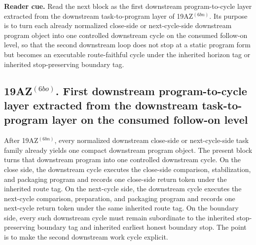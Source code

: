 \noindent\textbf{Reader cue.} Read the next block as the first downstream program-to-cycle layer extracted from the downstream task-to-program layer of 19AZ$^{(6bn)}$. Its purpose is to turn each already normalized close-side or next-cycle-side downstream program object into one controlled downstream cycle on the consumed follow-on level, so that the second downstream loop does not stop at a static program form but becomes an executable route-faithful cycle under the inherited horizon tag or inherited stop-preserving boundary tag.

\subsection*{19AZ$^{(6bo)}$. First downstream program-to-cycle layer extracted from the downstream task-to-program layer on the consumed follow-on level}
\label{sec:first-downstream-program-to-cycle-layer-extracted-from-the-downstream-task-to-program-layer-on-the-consumed-follow-on-level}
After 19AZ$^{(6bn)}$, every normalized downstream close-side or next-cycle-side task family already yields one compact downstream program object. The present block turns that downstream program into one controlled downstream cycle. On the close side, the downstream cycle executes the close-side comparison, stabilization, and packaging program and records one close-side return token under the inherited route tag. On the next-cycle side, the downstream cycle executes the next-cycle comparison, preparation, and packaging program and records one next-cycle return token under the same inherited route tag. On the boundary side, every such downstream cycle must remain subordinate to the inherited stop-preserving boundary tag and inherited earliest honest boundary stop. The point is to make the second downstream work cycle explicit.

